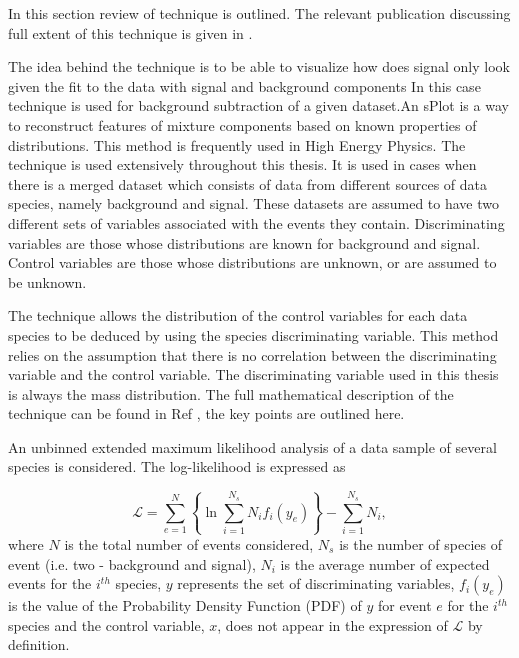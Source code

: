 \label{sec:splot}
In this section review of \sPlot technique is outlined. The relevant publication discussing full extent of this technique is given in \cite{sPlot}.

The idea behind the \sPlot technique is to be able to visualize how does signal only look given the fit to the data with signal and background components
In this case \sPlot technique is used for background subtraction of a given dataset.An sPlot is a way to reconstruct features of mixture components based on known properties of distributions. This method is frequently used in High Energy Physics.
The \sPlot technique is used extensively throughout this thesis. It is used in cases when there is a merged dataset which consists of data from different sources of data species, namely background and signal. These datasets are assumed to have two different sets of variables associated with the events they contain. Discriminating variables are those whose distributions are known for background and signal. Control variables are those whose distributions are unknown, or are assumed to be unknown.

The \sPlot technique allows the distribution of the control variables for each data species to be deduced by using the species discriminating variable. This method relies on the assumption that there is no correlation between the discriminating variable and the control variable. The discriminating variable used in this thesis is always the mass distribution. The full mathematical description of the \sPlot technique can be found in Ref \cite{pythia8} %
, the key points are outlined here.

An unbinned extended maximum likelihood analysis of a data sample of several species is considered. The log-likelihood is expressed as

\begin{equation}
  \mathcal{L} = \sum^{N}_{e = 1} \left\{\ln \sum^{N_{s}}_{i = 1} N_{i}f_{i}(y_{e})\right\} - \sum^{N_{s}}_{i = 1}N_{i},
  \label{eq:ll}
\end{equation}
where $N$ is the total number of events considered, $N_{s}$ is the number of species of event (i.e. two - background and signal), $N_{i}$ is the average number of expected events for the $i^{th}$ species, $y$ represents the set of discriminating variables, $f_{i}(y_{e})$ is the value of the Probability Density Function (PDF) of $y$ for event $e$ for the $i^{th}$ species and the control variable, $x$, does not appear in the expression of $\mathcal{L}$ by definition. 

